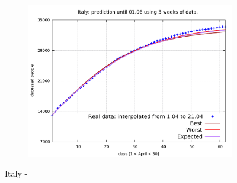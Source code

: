 \documentclass[8pt]{article}
\begin{document}
\begin{figure}[h!]
\begin{subfigure}[b]{0.45\linewidth}
  \includegraphics[width=\linewidth]{../err10p_simulations/it/1-21/1-21.pdf}
  \end{subfigure}
	\caption{Italy - }
\end{figure}
\end{document}
